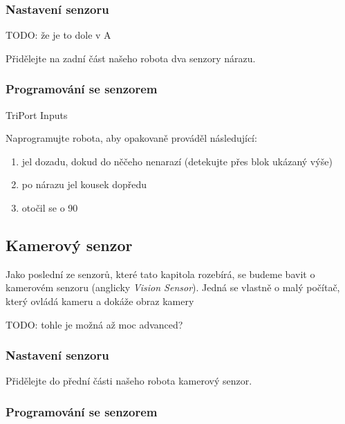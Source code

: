 \documentclass[../main.tex]{subfiles}
\begin{document}
	\subsubsection{Nastavení senzoru}
	TODO: že je to dole v A

	\begin{question}
		Přidělejte na zadní část našeho robota dva senzory nárazu.
	\end{question}

	\subsubsection{Programování se senzorem}
	TriPort Inputs

	\begin{question}
		Naprogramujte robota, aby opakovaně prováděl následující:
		\begin{enumerate}
			\item jel dozadu, dokud do něčeho nenarazí (detekujte přes blok ukázaný výše)
			\item po nárazu jel kousek dopředu
			\item otočil se o 90\degree
		\end{enumerate}
	\end{question}

	\subsection{Kamerový senzor}
	Jako poslední ze senzorů, které tato kapitola rozebírá, se budeme bavit o kamerovém senzoru (anglicky \textit{Vision Sensor}). Jedná se vlastně o malý počítač, který ovládá kameru a dokáže obraz kamery 

	TODO: tohle je možná až moc advanced?

	\subsubsection{Nastavení senzoru}

	\begin{question}
		Přidělejte do přední části našeho robota kamerový senzor.
	\end{question}

	\subsubsection{Programování se senzorem}
\end{document}
